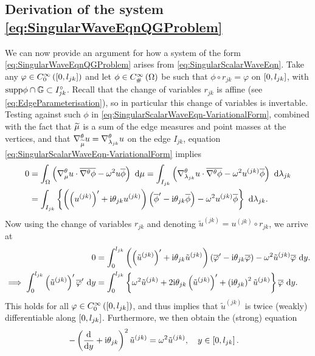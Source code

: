 \subsection{Derivation of the system \eqref{eq:SingularWaveEqnQGProblem}} \label{ssec:Scalar-QGDerivation}
We can now provide an argument for how a system of the form \eqref{eq:SingularWaveEqnQGProblem} arises from \eqref{eq:SingularScalarWaveEqn}.
Take any $\varphi\in C^{\infty}_{0}\left( \left[ 0,l_{jk} \right] \right)$ and let $\phi\in C^{\infty}_{\#}\left( \Omega \right)$ be such that $\phi\circ r_{jk} = \varphi$ on $\left[ 0,l_{jk} \right]$, with $\mathrm{supp}\phi\cap\mathbb{G}\subset I_{jk}^{\circ}$.
Recall that the change of variables $r_{jk}$ is affine (see \eqref{eq:EdgeParameterisation}), so in particular this change of variables is invertable.
Testing against such $\phi$ in \eqref{eq:SingularScalarWaveEqn-VariationalForm}, combined with the fact that $\widetilde{\mu}$ is a sum of the edge measures and point masses at the vertices, and that $\nabla^{\theta}_{\widetilde{\mu}}u=\nabla^{\theta}_{\lambda_{jk}}u$ on the edge $I_{jk}$, equation \eqref{eq:SingularScalarWaveEqn-VariationalForm} implies
\begin{align*}
	0 &= \int_{\Omega} \left( \nabla^{\theta}_\mu u \cdot \overline{\nabla^{\theta}\phi} - \omega^2 u\overline{\phi} \right)  \ \mathrm{d}\mu
	= \int_{I_{jk}} \left( \nabla^{\theta}_{\lambda_{jk}}u \cdot \overline{\nabla^{\theta}\phi} - \omega^2 u^{(jk)}\overline{\phi} \right)  \ \mathrm{d}\lambda_{jk} \\
	&= \int_{I_{jk}} \left\{  \left( \left( u^{(jk)} \right)' + \mathrm{i}\theta_{jk} u^{(jk)} \right)\left( \overline{\phi}' - \mathrm{i}\theta_{jk} \overline{\phi}  \right) - \omega^2 u^{(jk)}\overline{\phi}  \right\}  \ \mathrm{d}\lambda_{jk}.
\end{align*}
Now using the change of variables $r_{jk}$ and denoting $\tilde{u}^{(jk)} = u^{(jk)} \circ r_{jk}$, we arrive at
\begin{align*}
	0 &= \int_{0}^{l_{jk}} \left( \left( \tilde{u}^{(jk)} \right)' + \mathrm{i}\theta_{jk} \tilde{u}^{(jk)} \right)\left( \overline{\varphi}' - \mathrm{i}\theta_{jk} \overline{\varphi}  \right) - \omega^2 \tilde{u}^{(jk)}\overline{\varphi} \ \mathrm{d} y. \\
	\implies
	\int_{0}^{l_{jk}} \left( \tilde{u}^{(jk)} \right)'\overline{\varphi}' \ \mathrm{d} y &=
	\int_{0}^{l_{jk}} \left\{  \omega^2\tilde{u}^{(jk)} + 2\mathrm{i}\theta_{jk}\left( \tilde{u}^{(jk)} \right)' + \left( \mathrm{i}\theta_{jk} \right)^2\tilde{u}^{(jk)}  \right\} \overline{\varphi} \ \mathrm{d} y.
\end{align*}
This holds for all $\varphi\in C^{\infty}_{0}\left( \left[ 0,l_{jk} \right] \right)$, and thus implies that $\tilde{u}^{(jk)}$ is twice (weakly) differentiable along $\left[ 0,l_{jk} \right]$.
Furthermore, we then obtain the (strong) equation
\begin{align*}
	-\left( \dfrac{\mathrm{d}}{\mathrm{d}y} + \mathrm{i}\theta_{jk} \right)^2 \tilde{u}^{(jk)} &= \omega^2 \tilde{u}^{(jk)}, \quad y\in\left[ 0,l_{jk} \right].
\end{align*}


